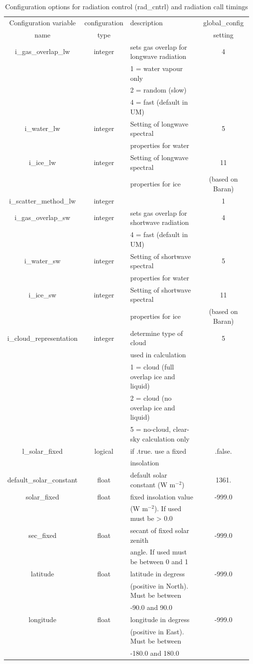 \documentclass[a4paper,11pt]{article}
\begin{document}
\begin{table}[H]
  \protect\caption{Configuration options for radiation control (rad\_cntrl)
  and radiation call timings}
\label{tab:socrates-radctl}
\begin{tabular}{|c|c|l|c|}
\hline
Configuration variable & configuration & description & global\_config \tabularnewline
name & type & & setting \tabularnewline
\hline
\hline
  i\_gas\_overlap\_lw & integer & sets gas overlap for longwave radiation & 4 \tabularnewline
   &  & 1 = water vapour only & \tabularnewline
   &  & 2 = random (slow)     &  \tabularnewline
   &  & 4 = fast (default in UM)  &  \tabularnewline
\hline
  i\_water\_lw  & integer & Setting of longwave spectral & 5 \tabularnewline
   &  &  properties for water & \tabularnewline
\hline
  i\_ice\_lw & integer & Setting of longwave spectral & 11 \tabularnewline
   &  & properties for ice & (based on Baran) \tabularnewline
\hline
  i\_scatter\_method\_lw  & integer &  & 1 \tabularnewline
\hline
  i\_gas\_overlap\_sw & integer & sets gas overlap for shortwave radiation  & 4 \tabularnewline
   &  &  4 = fast (default in UM)  &  \tabularnewline
\hline
  i\_water\_sw  & integer & Setting of shortwave spectral  & 5 \tabularnewline
   &  &  properties for water & \tabularnewline
\hline
  i\_ice\_sw  & integer & Setting of shortwave spectral & 11 \tabularnewline
  &  & properties for ice & (based on Baran) \tabularnewline
\hline
  i\_cloud\_representation & integer & determine type of cloud & 5 \tabularnewline
   &  &  used in calculation & \tabularnewline
   &  & 1 = cloud (full overlap ice and liquid) & \tabularnewline
   &  & 2 = cloud (no overlap ice and liquid)  & \tabularnewline
   &  & 5 = no-cloud, clear-sky calculation only & \tabularnewline
\hline
  l\_solar\_fixed & logical & if .true. use a fixed & .false. \tabularnewline
   &  & insolation & \tabularnewline
\hline
  default\_solar\_constant & float & default solar constant (W m$^{-2}$) & 1361. \tabularnewline
\hline
  solar\_fixed & float & fixed insolation value & -999.0 \tabularnewline
   &  & (W m$^{-2}$). If used must be > 0.0 & \tabularnewline
\hline
  sec\_fixed & float & secant of fixed solar zenith & -999.0 \tabularnewline
   &  & angle. If used must be between 0 and 1 & \tabularnewline
\hline
  latitude & float & latitude in degress & -999.0 \tabularnewline
   &  & (positive in North). Must be between & \tabularnewline
   &  & -90.0 and 90.0 & \tabularnewline
\hline
  longitude & float & longitude in degress & -999.0 \tabularnewline
   &  & (positive in East). Must be between & \tabularnewline
   &  & -180.0 and 180.0 & \tabularnewline

\end{tabular}
\end{table}
\end{document}
